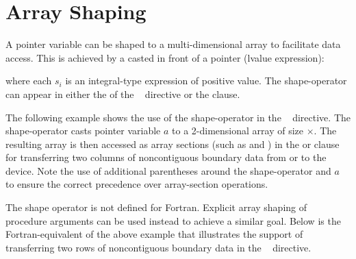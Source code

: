 \section{Array Shaping}
\label{sec:array-shaping}



\ccppspecificstart
A pointer variable can be shaped to a multi-dimensional array to facilitate
data access. This is achieved by a  casted in front of 
a pointer (lvalue expression):
\begin{description}
\item[]\hspace*{5mm}
\end{description}
where each $s_i$ is an integral-type expression of positive value.
The shape-operator can appear in either the 
of the ~ directive or the  clause.

The following example shows the use of the shape-operator in the 
~ directive. The shape-operator \code{([nx][ny+2])}
casts pointer variable $a$ to a 2-dimensional array of size
$\times$.  The resulting array is then accessed as
array sections (such as \code{[0:nx][1]} and \code{[0:nx][ny]}) 
in the  or  clause for transferring two columns of 
noncontiguous boundary data from or to the device.  
Note the use of additional parentheses
around the shape-operator and $a$ to ensure the correct precedence 
over array-section operations.

\ccppspecificend
\clearpage

The shape operator is not defined for Fortran.  Explicit array shaping
of procedure arguments can be used instead to achieve a similar goal.
Below is the Fortran-equivalent of the above example that illustrates
the support of transferring two rows of noncontiguous boundary
data in the ~ directive.
 
